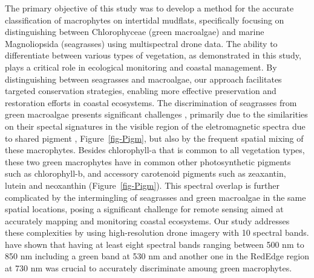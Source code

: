 \documentclass[
  number]{elsarticle}
\begin{document}
The primary objective of this study was to develop a method for the
accurate classification of macrophytes on intertidal mudflats,
specifically focusing on distinguishing between Chlorophyceae (green
macroalgae) and marine Magnoliopsida (seagrasses) using multispectral
drone data. The ability to differentiate between various types of
vegetation, as demonstrated in this study, plays a critical role in
ecological monitoring and coastal management. By distinguishing between
seagrasses and macroalgae, our approach facilitates targeted
conservation strategies, enabling more effective preservation and
restoration efforts in coastal ecosystems. The discrimination of
seagrasses from green macroalgae presents significant challenges
\citetext{\citealp[ ]{oiry2021using}; \citealp[
]{bannari2022}; \citealp{veettil2020opportunities}}, primarily due to
the similarities on their spectal signatures in the visible region of
the eletromagnetic spectra due to shared pigment
, Figure~\ref{fig-Pigm}, but also by the frequent spatial mixing of
these macrophytes. Besides chlorophyll-a that is common to all
vegetation types, these two green macrophytes have in common other
photosynthetic pigments such as chlorophyll-b, and accessory carotenoid
pigments such as zeaxantin, lutein and neoxanthin
(Figure~\ref{fig-Pigm}). This spectral overlap is further complicated by
the intermingling of seagrasses and green macroalgae in the same spatial
locations, posing a significant challenge for remote sensing aimed at
accurately mapping and monitoring coastal ecosystems. Our study
addresses these complexities by using high-resolution drone imagery with
10 spectral bands. \citep{Davies2023} have shown that having at least
eight spectral bands ranging between 500 nm to 850 nm including a green
band at 530 nm and another one in the RedEdge region at 730 nm was
crucial to accurately discriminate amoung green macrophytes.
\end{document}
